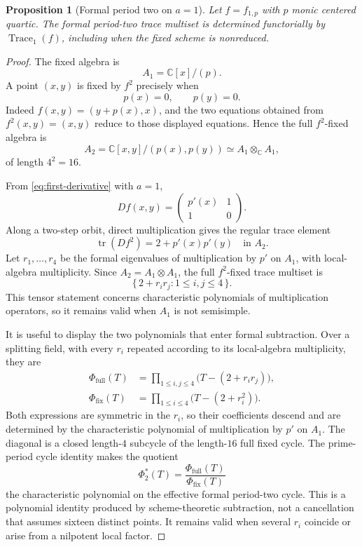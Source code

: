 \documentclass[11pt]{article}
\newtheorem{proposition}[theorem]{Proposition}
\theoremstyle{definition}
\newcommand{\C}{\mathbb C}
\newcommand{\tr}{\operatorname{tr}}
\newcommand{\Trace}{\operatorname{Trace}}
\begin{document}
\begin{proposition}[Formal period two on $a=1$]
\label{prop:period-two-determined}
Let $f=f_{1,p}$ with $p$ monic centered quartic. The formal period-two trace multiset is determined functorially by $\Trace_1(f)$, including when the fixed scheme is nonreduced.
\end{proposition}

\begin{proof}
The fixed algebra is
\[
A_1=\C[x]/(p).
\]
A point $(x,y)$ is fixed by $f^2$ precisely when
\[
p(x)=0,
\qquad
p(y)=0.
\]
Indeed $f(x,y)=(y+p(x),x)$, and the two equations obtained from $f^2(x,y)=(x,y)$ reduce to those displayed equations. Hence the full $f^2$-fixed algebra is
\begin{equation}
A_2=\C[x,y]/(p(x),p(y))
\simeq A_1\otimes_\C A_1,
\label{eq:period-two-algebra}
\end{equation}
of length $4^2=16$.

From \eqref{eq:first-derivative} with $a=1$,
\[
Df(x,y)=
\begin{pmatrix}p'(x)&1\\1&0\end{pmatrix}.
\]
Along a two-step orbit, direct multiplication gives the regular trace element
\begin{equation}
\tr(Df^2)=2+p'(x)p'(y)
\quad\text{in }A_2.
\label{eq:period-two-trace}
\end{equation}
Let $r_1,\ldots,r_4$ be the formal eigenvalues of multiplication by $p'$ on $A_1$, with local-algebra multiplicity. Since $A_2=A_1\otimes A_1$, the full $f^2$-fixed trace multiset is
\begin{equation}
\{\,2+r_ir_j:1\le i,j\le4\,\}.
\label{eq:full-period-two-values}
\end{equation}
This tensor statement concerns characteristic polynomials of multiplication operators, so it remains valid when $A_1$ is not semisimple.

It is useful to display the two polynomials that enter formal subtraction. Over a splitting field, with every $r_i$ repeated according to its local-algebra multiplicity, they are
\begin{align*}
\Phi_{\mathrm{full}}(T)
&=\prod_{1\le i,j\le4}\bigl(T-(2+r_ir_j)\bigr),\\
\Phi_{\mathrm{fix}}(T)
&=\prod_{1\le i\le4}\bigl(T-(2+r_i^2)\bigr).
\end{align*}
Both expressions are symmetric in the $r_i$, so their coefficients descend and are determined by the characteristic polynomial of multiplication by $p'$ on $A_1$. The diagonal is a closed length-$4$ subcycle of the length-$16$ full fixed cycle. The prime-period cycle identity makes the quotient
\[
\Phi_2^*(T)=\frac{\Phi_{\mathrm{full}}(T)}{\Phi_{\mathrm{fix}}(T)}
\]
the characteristic polynomial on the effective formal period-two cycle. This is a polynomial identity produced by scheme-theoretic subtraction, not a cancellation that assumes sixteen distinct points. It remains valid when several $r_i$ coincide or arise from a nilpotent local factor.


\end{proof}
\end{document}
